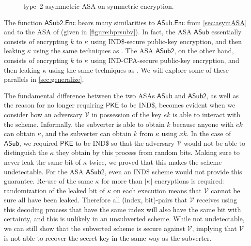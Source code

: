 \begin{wrapfigure}{R}{0.4\textwidth}
\centering
{}
\caption[type~2 asymmetric ASA on symmetric encryption]{type~2 asymmetric ASA on symmetric encryption.}
\label{figure:asymsubv2}
\end{wrapfigure}

The function $\mathsf{ASub2.Enc}$ bears many similarities to $\mathsf{ASub.Enc}$ from \autoref{sec:asymASA} and to the ASA of \cite{CCS:BelJaeKan15} (given in \autoref{figure:bprsubv}). In fact, the ASA $\mathsf{ASub}$ essentially consists of encrypting $k$ to $\kappa$ using IND\$-secure public-key encryption, and then leaking $\kappa$ using the same techniques as \cite{C:BelPatRog14}. The ASA $\mathsf{ASub2}$, on the other hand, consists of encrypting $k$ to $\kappa$ using IND-CPA-secure public-key encryption, and then leaking $\kappa$ using the same techniques as \cite{CCS:BelJaeKan15}. We will explore some of these parallels in \autoref{sec:generalize}.

The fundamental difference between the two ASAs $\mathsf{ASub}$ and $\mathsf{ASub2}$, as well as the reason for no longer requiring $\mathsf{PKE}$ to be IND\$, becomes evident when we consider how an adversary $\mathcal{V}$ in possession of the key $ek$ is able to interact with the scheme. Informally, the subverter is able to obtain $k$ because anyone with $ek$ can obtain $\kappa$, and the subverter can obtain $k$ from $\kappa$ using $xk$. In the case of $\mathsf{ASub}$, we required $\mathsf{PKE}$ to be IND\$ so that the adversary $\mathcal{V}$ would not be able to distinguish the $\kappa$ they obtain by this process from random bits. Making sure to never leak the same bit of $\kappa$ twice, we proved that this makes the scheme undetectable. For the ASA $\mathsf{ASub2}$, even an IND\$ scheme would not provide this guarantee. Re-use of the same $\kappa$ for more than $|\kappa|$ encryptions is required: randomization of the leaked bit of $\kappa$ on each execution means that $\mathcal{V}$ cannot be sure all have been leaked. Therefore all (index, bit)-pairs that $\mathcal{V}$ receives using this decoding process that have the same index will also have the same bit with certainty, and this is unlikely in an unsubverted scheme. While not undetectable, we can still show that the subverted scheme is secure against $\mathcal{V}$, implying that $\mathcal{V}$ is not able to recover the secret key in the same way as the subverter.

